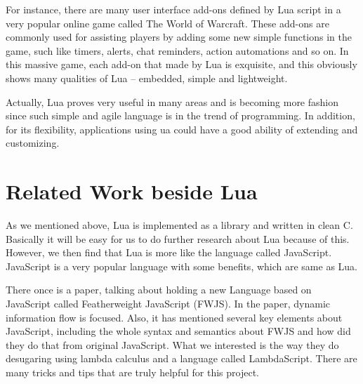 For instance, there are many user interface add-ons defined by Lua script in a very popular online game called The World of Warcraft\cite{wowLua}. These add-ons are commonly used for assisting players by adding some new simple functions in the game, such like timers, alerts, chat reminders, action automations and so on. In this massive game, each add-on that made by Lua is exquisite, and this obviously shows many qualities of Lua -- embedded, simple and lightweight.

Actually, Lua proves very useful in many areas and is becoming more fashion since such simple and agile language is in the trend of programming. In addition, for its flexibility, applications using ua could have a good ability of extending and customizing.

\section{Related Work beside Lua}
As we mentioned above, Lua is implemented as a library and written in clean C. Basically it will be easy for us to do further research about Lua because of this. However, we then find that Lua is more like the language called JavaScript. JavaScript is a very popular language with some benefits, which are same as Lua.

There once is a paper, talking about holding a new Language based on JavaScript called Featherweight JavaScript (FWJS). In the paper, dynamic information flow is focused. Also, it has mentioned several key elements about JavaScript, including the whole syntax and semantics about FWJS and how did they do that from original JavaScript. What we interested is the way they do desugaring using lambda calculus and a language called LambdaScript. There are many tricks and tips that are truly helpful for this project.